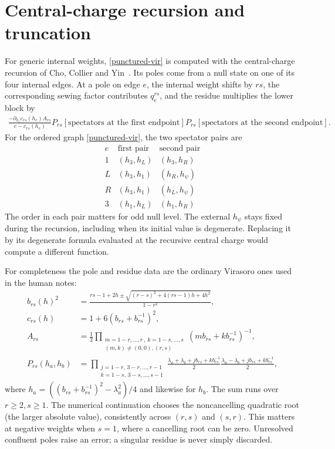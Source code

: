 \documentclass[12pt]{article}
\newcommand{\ie}{\begin{equation}\begin{aligned}}
\newcommand{\fe}{\end{aligned}\end{equation}}
\numberwithin{equation}{section}
\begin{document}
\section{Central-charge recursion and truncation}
\label{ccy-and-truncation}

For generic internal weights, \eqref{punctured-vir} is computed with the
central-charge recursion of Cho, Collier and Yin~\cite{CCY}.  Its poles
come from a null state on one of its four internal edges.  At a pole on
edge $e$, the internal weight shifts by $rs$, the corresponding sewing
factor contributes $q_e^{rs}$, and the residue multiplies the lower
block by
\ie
 \frac{-\partial_{h_e}c_{rs}(h_e) A_{rs}}
 {c-c_{rs}(h_e)}
 P_{rs}[\text{spectators at the first endpoint}]
 P_{rs}[\text{spectators at the second endpoint}].
\fe
For the ordered graph \eqref{punctured-vir}, the two spectator pairs are
\[
\begin{array}{c|cc}
e&\text{first pair}&\text{second pair}\\\hline
1&(h_3,h_L)&(h_3,h_R)\\
L&(h_3,h_1)&(h_R,h_\psi)\\
R&(h_3,h_1)&(h_L,h_\psi)\\
3&(h_1,h_L)&(h_1,h_R)
\end{array}
\]
The order in each pair matters for odd null level.  The external
$h_\psi$ stays fixed during the recursion, including when its initial
value is degenerate.  Replacing it by its degenerate formula evaluated
at the recursive central charge would compute a different function.

For completeness the pole and residue data are the ordinary Virasoro
ones used in the human notes:
\ie
 b_{rs}(h)^2&=\frac{rs-1+2h\pm
 \sqrt{(r-s)^2+4(rs-1)h+4h^2}}{1-r^2},\\
 c_{rs}(h)&=1+6(b_{rs}+b_{rs}^{-1})^2,\\
 A_{rs}&=\frac12\prod_{\substack{m=1-r,\ldots,r\,,\ k=1-s,\ldots,s\\
 (m,k)\ne(0,0),(r,s)}}(mb_{rs}+kb_{rs}^{-1})^{-1},\\
 P_{rs}(h_a,h_b)&=
 \prod_{\substack{j=1-r,\,3-r,\ldots,r-1\\ k=1-s,\,3-s,\ldots,s-1}}
 \frac{\lambda_a+\lambda_b+jb_{rs}+kb_{rs}^{-1}}2
 \frac{\lambda_a-\lambda_b+jb_{rs}+kb_{rs}^{-1}}2,
\fe
where $h_a=((b_{rs}+b_{rs}^{-1})^2-\lambda_a^2)/4$ and likewise for
$h_b$.  The sum runs over $r\geq2,s\geq1$.  The numerical continuation
chooses the noncancelling quadratic root (the larger absolute value),
consistently across $(r,s)$ and $(s,r)$.  This matters at negative weights
when $s=1$, where a cancelling root can be zero.  Unresolved confluent
poles raise an error; a singular residue is never simply discarded.
\end{document}
